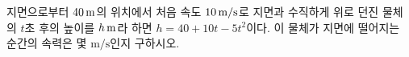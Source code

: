 지면으로부터 $40\mkern3mu \mathrm{m}$의 위치에서 처음 속도 $10\mkern3mu \mathrm{m/s}$로 지면과 수직하게 위로 던진 물체의 $t$초 후의 높이를 $h\mkern3mu \mathrm{m}$라 하면 $h=40+10t-5t^2$이다. 이 물체가 지면에 떨어지는 순간의 속력은 몇 $\mathrm{m/s}$인지 구하시오.
